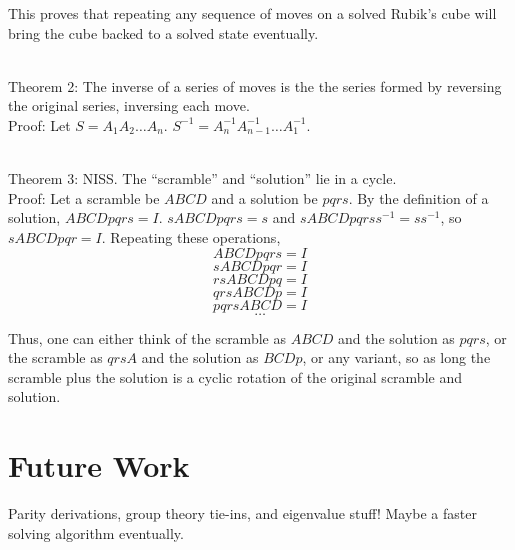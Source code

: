 \documentclass[11pt, oneside]{article}
\begin{document}
This proves that repeating any sequence of moves on a solved Rubik's cube will bring
the cube backed to a solved state eventually.

\noindent
\\ Theorem 2: The inverse of a series of moves is the the series formed by reversing the original series, inversing each move.
\\ Proof: Let \( S = A_1 A_2 \dots A_n \). \( S^{-1} =  A_n^{-1} A_{n - 1}^{-1} \dots A_1^{-1} \).

\noindent
\\ Theorem 3: NISS. The ``scramble'' and ``solution'' lie in a cycle.
\\ Proof: Let a scramble be \( ABCD \) and a solution be \( pqrs \).
By the definition of a solution, \( ABCDpqrs = I \).
\( sABCDpqrs = s \) and \( sABCDpqrss^{-1} = ss^{-1} \), so
\( sABCDpqr = I \).
Repeating these operations,
\[ ABCDpqrs = I \]
\[ sABCDpqr = I \]
\[ rsABCDpq = I \]
\[ qrsABCDp = I \]
\[ pqrsABCD = I \]
\[ \dots \]

Thus, one can either think of the scramble as \( ABCD \) and the solution as
\( pqrs \), or the scramble as \( qrsA \) and the solution as \( BCDp \),
or any variant, so as long the scramble plus the solution is a cyclic rotation of the original scramble and solution.

\section{Future Work}

Parity derivations, group theory tie-ins, and eigenvalue stuff!
Maybe a faster solving algorithm eventually.
\end{document}
